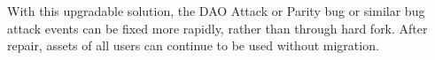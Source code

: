 
With this upgradable solution, the DAO Attack or Parity bug or similar bug attack events can be fixed more rapidly, rather than through hard fork. After repair, assets of all users can continue to be used without migration.



